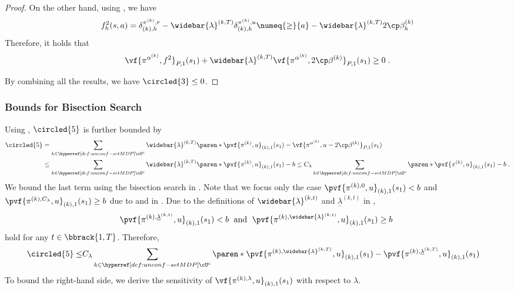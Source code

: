 \begin{proof}
On the other hand, using , we have 
\begin{align*}
f^2_h(s, a) 
= \delta^{\pi^{(k)}, r}_{(k), h} - \widebar{\lambda}^{(k, T)}\delta^{\pi^{(k)}, u}_{(k), h}
\numeq{\geq}{a}
- \widebar{\lambda}^{(k, T)} 2\cp \beta^{(k)}_h
\end{align*}
Therefore, it holds that 
\begin{align*}
\vf{\pi^{\alpha^{(k)}}, f^2}_{P, 1}(s_1) 
+ \widebar{\lambda}^{(k, T)}\vf{\pi^{\alpha^{(k)}}, 2\cp \beta^{(k)}}_{P, 1}(s_1) 
\geq 0\;.
\end{align*}

By combining all the results, we have \(\circled{3} \leq 0\).
\end{proof}

\subsubsection{Bounds for Bisection Search}

Using , $\circled{5}$ is further bounded by 
\begin{align*}
\circled{5} &= \sum_{k\in \unconfMDP^c}
\widebar{\lambda}^{(k, T)}
\paren*{
\pvf{\pi^{(k)}, u}_{(k), 1}(s_1) - \vf{\pi^{\alpha^{(k)}}, u - 2\cp\beta^{(k)}}_{P, 1}(s_1)
}\\
& \leq 
\sum_{k\in \unconfMDP^c}
\widebar{\lambda}^{(k, T)}
\paren*{
\pvf{\pi^{(k)}, u}_{(k), 1}(s_1) - b
}
\leq 
C_\lambda
\sum_{k\in \unconfMDP^c}
\paren*{
\pvf{\pi^{(k)}, u}_{(k), 1}(s_1) - b
}
\;.
\end{align*}
We bound the last term using the bisection search in .
Note that we focus only the case $\pvf{\pi^{(k), 0}, u}_{(k), 1}(s_1) < b$ and $\pvf{\pi^{(k), C_\lambda}, u}_{(k), 1}(s_1) \geq b$ due to  and  in . 
Due to the definitions of $\widebar{\lambda}^{(k, t)}$ and $\underline{\lambda}^{(k, t)}$ in , 
$$
\pvf{\pi^{(k), \underline{\lambda}^{(k, t)}}, u}_{(k), 1}(s_1) < b
  \;\text{ and }\;
\pvf{\pi^{(k), \widebar{\lambda}^{(k, t)}}, u}_{(k), 1}(s_1) \geq b\;
$$
hold for any $t \in \bbrack{1, T}$. 
Therefore, 
\begin{align*}
\circled{5}
\leq &C_\lambda \sum_{k \in \unconfMDP^c} 
\paren*{
\pvf{\pi^{(k), \widebar{\lambda}^{(k, T)}}, u}_{(k), 1}(s_1) - 
\pvf{\pi^{(k), \underline{\lambda}^{(k, T)}}, u}_{(k), 1}(s_1)
}
\end{align*}
To bound the right-hand side, we derive the sensitivity of $\vf{\pi^{(k), \lambda}, u}_{(k), 1}(s_1)$ with respect to $\lambda$.

